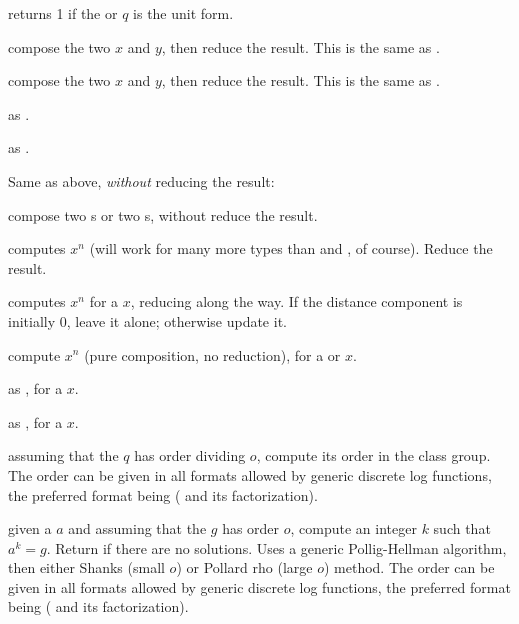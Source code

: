  returns 1 if the  or 
$q$ is the unit form.


 compose the two  $x$ and $y$,
then reduce the result. This is the same as .

 compose the two  $x$ and $y$,
then reduce the result. This is the same as .

 as .

 as .

\noindent Same as above, \emph{without} reducing the result:





 compose two s or two s,
without reduce the result.


 computes $x^n$ (will work for many more types
than  and , of course). Reduce the result.

 computes $x^n$ for a  $x$, reducing
along the way. If the distance component is initially $0$, leave it alone;
otherwise update it.

 compute $x^n$ (pure composition, no
reduction), for a  or  $x$.

 as , for a  $x$.

 as , for a  $x$.


assuming that the  $q$ has order dividing $o$, compute its
order in the class group. The order can be given in all formats allowed by
generic discrete log functions, the preferred format being \kbd{[ord, fa]}
( and its factorization).

 given a  $a$ and assuming
that the  $g$ has order $o$, compute an integer $k$ such that $a^k =
g$. Return  if there are no solutions. Uses a generic
Pollig-Hellman algorithm, then either Shanks (small $o$) or Pollard rho
(large $o$) method. The order can be given in all formats allowed by generic
discrete log functions, the preferred format being \kbd{[ord, fa]}
( and its factorization).

